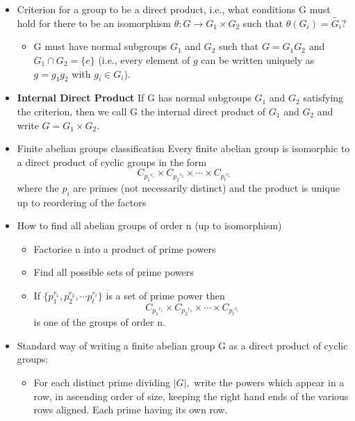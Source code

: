 \documentclass[a4paper, 12pt]
{article}
\begin{document}
\begin{itemize}
 	\item Criterion for a group to be a direct product, i.e., what conditions G must hold for there to be an isomorphism $\theta: G \rightarrow G_1 \times G_2$ such that $\theta(G_i) = \tilde{G_i}?$
 	\begin{itemize}
 		\item G must have normal subgroups $G_1$ and $G_2$ such that $G= G_1G_2$ and $G_1 \cap G_2 = \{e\}$ (i.e., every element of $g$ can be written uniquely as $g= g_1g_2$ with $g_i \in G_i$).
 	\end{itemize} 
 	
 	\item \textbf{Internal Direct Product} If G has normal subgroups $G_1$ and $G_2$ satisfying the criterion, then we call G the internal direct product of $G_1$ and $G_2$ and write $G= G_1 \times G_2.$ 

	\item Finite abelian groups classification
	Every finite abelian group is isomorphic to a direct product of cyclic groups in the form
	$$C_{{p_1}^{r_1}} \times C_{{p_2}^{r_2}} \times \cdots \times C_{{p_t}^{r_t}}$$
	where the $p_i$ are primes (not necessarily distinct) and the product is unique up to reordering of the factors
	
	\item How to find all abelian groups of order n (up to isomorphism)
	
	\begin{itemize}
		\item Factorise n into a product of prime powers
		
		\item Find all possible sets of prime powers
		
		\item If $\{p_1^{r_1}, p_2^{r_2}, \cdots p_t^{r_t}\}$ is a set of prime power then $$C_{{p_1}^{r_1}} \times C_{{p_2}^{r_2}} \times \cdots \times C_{{p_t}^{r_t}}$$ is one of the groups of order n.
	\end{itemize}
	
	\item Standard way of writing a finite abelian group G as a direct product of cyclic groups:
	
	\begin{itemize}
		\item For each distinct prime dividing $|G|,$ write the powers which appear in a row, in ascending order of size, keeping the right hand ends of the various rows aligned. Each prime having its own row.
		

\end{itemize}
\end{itemize}
\end{document}
